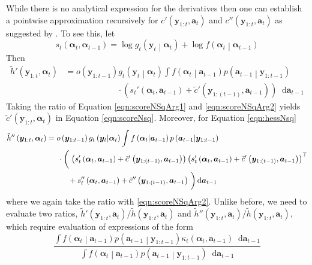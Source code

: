 \documentclass[notitlepage]{article}
\renewcommand{\vec}[1]{\bm{#1}}
\newcommand{\Lparen}[1]{\left( #1\right)}
\newcommand{\Cond}[2]{ #1 \middle\vert  #2}
\newcommand*\diff{\mathop{}\!\mathrm{d}}
\newcommand{\optor}[2]{#1\Lparen{#2}}
\newcommand{\optorC}[3]{\optor{#1}{\Cond{#2}{#3}}}
\begin{document}
While there is no analytical expression for the derivatives then one can 
establish a pointwise approximation recursively
for $c'\Lparen{\vec y_{1:t}, \vec a_t}$ and $c''\Lparen{\vec y_{1:t}, \vec a_t}$ 
as suggested by \cite{poyiadjis11}. To see this, let%
%
$$
s_t\Lparen{\vec\alpha_t, \vec\alpha_{t - 1}} 
	= \log\optorC{g_t}{\vec y_t}{\vec \alpha_t} + 
		\log\optorC{f}{\vec\alpha_t}{\vec\alpha_{t - 1}}
$$%
% 
Then 
%
\begin{align}
\tilde h'\Lparen{\vec y_{1:t}, \vec\alpha_t}
	&= o\Lparen{\vec y_{1:{t - 1}}}\optorC{g_t}{\vec y_t}{\vec\alpha_t}
	\int \optorC{f}{\vec\alpha_t}{\vec a_{t - 1}}
		\optorC{p}{\vec a_{t - 1}}{\vec y_{1:{t - 1}}} \label{eqn:scoreNSqArg1}\\
&\hspace{75pt}\cdot
		\Lparen{s_t'\Lparen{\vec\alpha_t, \vec a_{t - 1}}
			+
		\tilde c'\Lparen{\vec y_{1:(t - 1)}, \vec a_{t - 1}}}
		\diff\vec a_{t - 1} \nonumber
\end{align}%
%
Taking the ratio of Equation \eqref{eqn:scoreNSqArg1} and \eqref{eqn:scoreNSqArg2}
yields $\tilde c'\Lparen{\vec y_{1:t}, \vec\alpha_t}$ in Equation \eqref{eqn:scoreNsq}.
Moreover, for Equation \eqref{eqn:hessNsq} %
%
\begin{align*}
\tilde h''\Lparen{\vec y_{1:t}, \vec\alpha_t}
	&= o\Lparen{\vec y_{1:{t - 1}}}\optorC{g_t}{\vec y_t}{\vec\alpha_t}
	\int\optorC{f}{\vec\alpha_t}{\vec a_{t - 1}}
	\optorC{p}{\vec a_{t - 1}}{\vec y_{1:{t - 1}}}\nonumber\\
&\hspace{15pt}\cdot
		\left(\vphantom{\int}\right.
		\Lparen{s_t'\Lparen{\vec\alpha_t, \vec a_{t - 1}}
			+ \tilde c'\Lparen{\vec y_{1:(t - 1)}, \vec a_{t - 1}}} 
		\Lparen{s_t'\Lparen{\vec\alpha_t, \vec a_{t - 1}}
			+ \tilde c'\Lparen{\vec y_{1:(t - 1)}, \vec a_{t - 1}}}^\top \\
&\hspace{28pt}+
		s_t''\Lparen{\vec\alpha_t, \vec a_{t - 1}} + 
		\tilde c''\Lparen{\vec y_{1:(t - 1)}, \vec a_{t - 1}}
		\left.\vphantom{\int}\right)\diff\vec a_{t - 1}\nonumber
\end{align*}%
% 
where we again take the ratio with \eqref{eqn:scoreNSqArg2}. Unlike before, 
we need to evaluate two ratios, 
$\tilde h'\Lparen{\vec y_{1:t}, \vec a_t}/\tilde h\Lparen{\vec y_{1:t}, \vec a_t}$
and
$\tilde h''\Lparen{\vec y_{1:t}, \vec a_t}/\tilde h\Lparen{\vec y_{1:t}, \vec a_t}$, 
which require evaluation of expressions of the form%
%
\begin{equation}\label{eqn:NsqNeedApprox}
\frac{\int\optorC{f}{\vec\alpha_t}{\vec a_{t - 1}}
	\optorC{p}{\vec a_{t - 1}}{\vec y_{1:{t - 1}}}
	\kappa_t\Lparen{\vec\alpha_t, \vec a_{t - 1}}
	\diff\vec a_{t - 1}}{
	\int\optorC{f}{\vec\alpha_t}{\vec a_{t - 1}}
	\optorC{p}{\vec a_{t - 1}}{\vec y_{1:{t - 1}}}
	\diff\vec a_{t - 1}}
\end{equation}%
\end{document}
